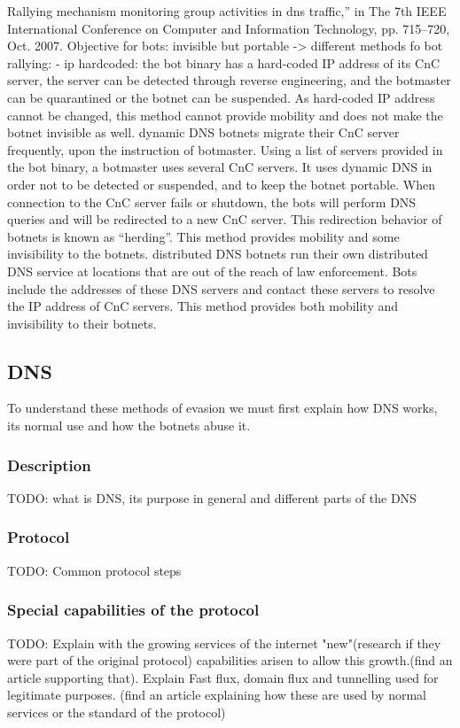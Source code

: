 Rallying mechanism %
monitoring group activities in dns traffic,” in The 7th IEEE International Conference on Computer
and Information Technology, pp. 715–720, Oct. 2007.
Objective for bots: invisible but portable -> different methods fo bot rallying: - ip hardcoded: the bot
binary has a hard-coded IP address of its CnC server, the server can be detected through reverse
engineering, and the botmaster can be quarantined or the botnet can be suspended. As hard-coded
IP address cannot be changed, this method cannot provide mobility and does not make the botnet
invisible as well.
dynamic DNS %
botnets migrate their CnC server frequently, upon the instruction of botmaster. Using a list of
servers provided in the bot binary, a botmaster uses several CnC servers. It uses dynamic DNS in
order not to be detected or suspended, and to keep the botnet portable. When connection to the
CnC server fails or shutdown, the bots will perform DNS queries and will be redirected to a new
CnC server. This redirection behavior of botnets is known as “herding”. This method provides
mobility and some invisibility to the botnets.
distributed DNS 
botnets run their own distributed DNS service at locations that are out of the reach of law
enforcement. Bots include the addresses of these DNS servers and contact these servers to resolve
the IP address of CnC servers. This method provides both mobility and invisibility to their botnets.

\subsection{DNS}
To understand these methods of evasion we must first explain how DNS works, its normal use and how the botnets abuse it.
\subsubsection{Description}
TODO: what is DNS, its purpose in general and different parts of the DNS
\subsubsection{Protocol}
TODO: Common protocol steps
\subsubsection{Special capabilities of the protocol}
TODO: Explain with the growing services of the internet "new"(research if they were part of the original protocol) capabilities arisen to allow this growth.(find an article supporting that). 
Explain Fast flux, domain flux and tunnelling used for legitimate purposes.
(find an article explaining how these are used by normal services or the standard of the protocol)

